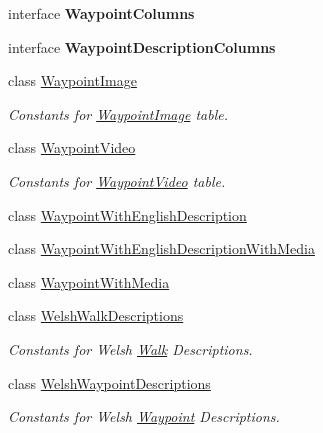 \begin{DoxyCompactItemize}
interface {\bfseries Waypoint\+Columns}
\item 
interface {\bfseries Waypoint\+Description\+Columns}
\item 
class \hyperlink{classuk_1_1ac_1_1swan_1_1digitaltrails_1_1database_1_1_white_rock_contract_1_1_waypoint_image}{Waypoint\+Image}
\begin{DoxyCompactList}\small\item\em Constants for \hyperlink{classuk_1_1ac_1_1swan_1_1digitaltrails_1_1database_1_1_white_rock_contract_1_1_waypoint_image}{Waypoint\+Image} table. \end{DoxyCompactList}\item 
class \hyperlink{classuk_1_1ac_1_1swan_1_1digitaltrails_1_1database_1_1_white_rock_contract_1_1_waypoint_video}{Waypoint\+Video}
\begin{DoxyCompactList}\small\item\em Constants for \hyperlink{classuk_1_1ac_1_1swan_1_1digitaltrails_1_1database_1_1_white_rock_contract_1_1_waypoint_video}{Waypoint\+Video} table. \end{DoxyCompactList}\item 
class \hyperlink{classuk_1_1ac_1_1swan_1_1digitaltrails_1_1database_1_1_white_rock_contract_1_1_waypoint_with_english_description}{Waypoint\+With\+English\+Description}
\item 
class \hyperlink{classuk_1_1ac_1_1swan_1_1digitaltrails_1_1database_1_1_white_rock_contract_1_1_waypoint_with_english_description_with_media}{Waypoint\+With\+English\+Description\+With\+Media}
\item 
class \hyperlink{classuk_1_1ac_1_1swan_1_1digitaltrails_1_1database_1_1_white_rock_contract_1_1_waypoint_with_media}{Waypoint\+With\+Media}
\item 
class \hyperlink{classuk_1_1ac_1_1swan_1_1digitaltrails_1_1database_1_1_white_rock_contract_1_1_welsh_walk_descriptions}{Welsh\+Walk\+Descriptions}
\begin{DoxyCompactList}\small\item\em Constants for Welsh \hyperlink{classuk_1_1ac_1_1swan_1_1digitaltrails_1_1database_1_1_white_rock_contract_1_1_walk}{Walk} Descriptions. \end{DoxyCompactList}\item 
class \hyperlink{classuk_1_1ac_1_1swan_1_1digitaltrails_1_1database_1_1_white_rock_contract_1_1_welsh_waypoint_descriptions}{Welsh\+Waypoint\+Descriptions}
\begin{DoxyCompactList}\small\item\em Constants for Welsh \hyperlink{classuk_1_1ac_1_1swan_1_1digitaltrails_1_1database_1_1_white_rock_contract_1_1_waypoint}{Waypoint} Descriptions. \end{DoxyCompactList}\end{DoxyCompactItemize}

